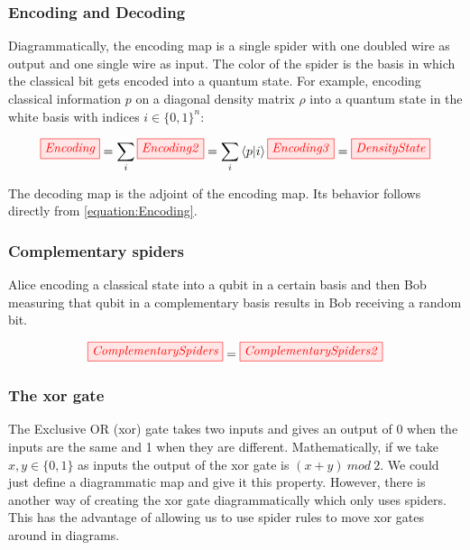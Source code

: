 \documentclass[]{article}
\begin{document}
\subsubsection{Encoding and Decoding}
\label{encodingdecoding}

Diagrammatically, the encoding map is a single spider with one doubled wire as output and one single wire as input. The color of the spider is the basis in which the classical bit gets encoded into a quantum state. For example, encoding classical information $p$ on a diagonal density matrix $\rho$ into a quantum state in the white basis with indices $i \in \{0,1\}^n$:

\begin{equation}
	\label{equation:Encoding}
	\tikzfig{Encoding} = \sum\limits_{i} \tikzfig{Encoding2} = \sum\limits_{i} \bra{p}\ket{i} \tikzfig{Encoding3} = \tikzfig{DensityState}
\end{equation}

The decoding map is the adjoint of the encoding map. Its behavior follows directly from \ref{equation:Encoding}.

\subsubsection{Complementary spiders}
\label{complementarity}
Alice encoding a classical state into a qubit in a certain basis and then Bob measuring that qubit in a complementary basis results in Bob receiving a random bit.


\begin{equation}
	\label{equation:Complementarity}
	\tikzfig{ComplementarySpiders} = \tikzfig{ComplementarySpiders2}
\end{equation}

\subsubsection{The xor gate}

\label{xorgate}

The Exclusive OR (xor) gate takes two inputs and gives an output of 0 when the inputs are the same and 1 when they are different. Mathematically, if we take $x, y \in \{0,1\} $ as inputs the output of the xor gate is $(x + y)~mod~2$. We could just define a diagrammatic map and give it this property. However, there is another way of creating the xor gate diagrammatically which only uses spiders. This has the advantage of allowing us to use spider rules to move xor gates around in diagrams.
\end{document}
